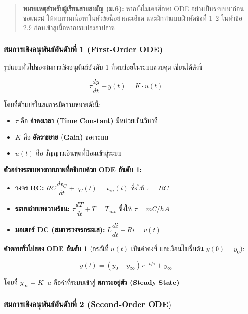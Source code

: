 \begin{quote}
\textbf{หมายเหตุสำหรับผู้เรียนสายสามัญ (ม.6):} หากยังไม่เคยศึกษา ODE
อย่างเป็นระบบมาก่อน ขอแนะนำให้ทบทวนเนื้อหาในหัวข้อนี้อย่างละเอียด และฝึกทำแบบฝึกหัดข้อที่
1--2 ในหัวข้อ 2.9 ก่อนเข้าสู่เนื้อหาการแปลงลาปลาซ
\end{quote}

\subsubsection{สมการเชิงอนุพันธ์อันดับที่ 1 (First-Order
ODE)}\label{uxe2auxe21uxe01uxe32uxe23uxe40uxe0auxe07uxe2duxe19uxe1euxe19uxe18uxe2duxe19uxe14uxe1auxe17-1-first-order-ode}

รูปแบบทั่วไปของสมการเชิงอนุพันธ์อันดับ 1 ที่พบบ่อยในระบบควบคุม เขียนได้ดังนี้

\[\tau \frac{dy}{dt} + y(t) = K \cdot u(t)\]

โดยที่ตัวแปรในสมการมีความหมายดังนี้:

\begin{itemize}
\tightlist
\item
  \(\tau\) คือ \textbf{ค่าคงเวลา (Time Constant)} มีหน่วยเป็นวินาที
\item
  \(K\) คือ \textbf{อัตราขยาย (Gain)} ของระบบ
\item
  \(u(t)\) คือ สัญญาณอินพุตที่ป้อนเข้าสู่ระบบ
\end{itemize}

\textbf{ตัวอย่างระบบทางกายภาพที่อธิบายด้วย ODE อันดับ 1:}

\begin{itemize}
\tightlist
\item
  \textbf{วงจร RC:} \(RC\dfrac{dv_C}{dt} + v_C(t) = v_{in}(t)\) ซึ่งให้
  \(\tau = RC\)
\item
  \textbf{ระบบถ่ายเทความร้อน:} \(\tau\dfrac{dT}{dt} + T = T_{env}\) ซึ่งให้
  \(\tau = mC/hA\)
\item
  \textbf{มอเตอร์ DC (สมการวงจรกระแส):} \(L\dfrac{di}{dt} + Ri = v(t)\)
\end{itemize}

\textbf{คำตอบทั่วไปของ ODE อันดับ 1} (กรณีที่ \(u(t)\) เป็นค่าคงที่ และเงื่อนไขเริ่มต้น
\(y(0) = y_0\)):

\[\boxed{y(t) = (y_0 - y_\infty)\,e^{-t/\tau} + y_\infty}\]

โดยที่ \(y_\infty = K \cdot u\) คือค่าที่ระบบเข้าสู่ \textbf{สภาวะอยู่ตัว (Steady
State)}

\subsubsection{สมการเชิงอนุพันธ์อันดับที่ 2 (Second-Order
ODE)}\label{uxe2auxe21uxe01uxe32uxe23uxe40uxe0auxe07uxe2duxe19uxe1euxe19uxe18uxe2duxe19uxe14uxe1auxe17-2-second-order-ode}

